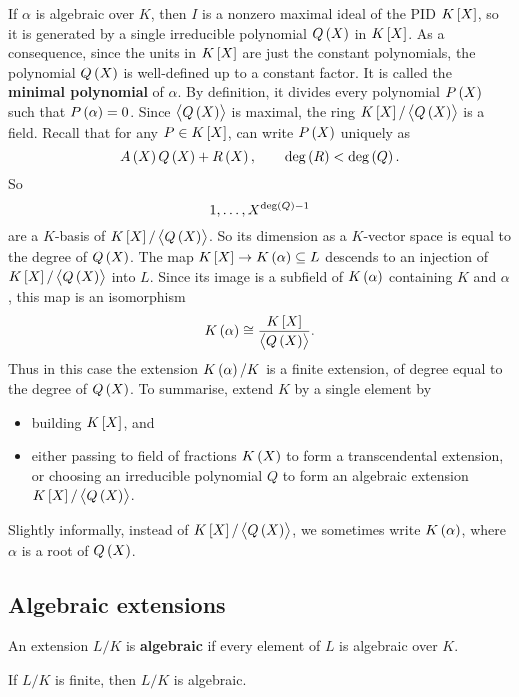 If $ \alpha $ is algebraic over $ K $, then $ I $ is a nonzero maximal ideal of the PID $ K\sbr{X} $, so it is generated by a single irreducible polynomial $ Q\br{X} $ in $ K\sbr{X} $. As a consequence, since the units in $ K\sbr{X} $ are just the constant polynomials, the polynomial $ Q\br{X} $ is well-defined up to a constant factor. It is called the \textbf{minimal polynomial} of $ \alpha $. By definition, it divides every polynomial $ P\br{X} $ such that $ P\br{\alpha} = 0 $. Since $ \abr{Q\br{X}} $ is maximal, the ring $ K\sbr{X} / \abr{Q\br{X}} $ is a field. Recall that for any $ P \in K\sbr{X} $, can write $ P\br{X} $ uniquely as
$$ A\br{X}Q\br{X} + R\br{X}, \qquad \deg\br{R} < \deg\br{Q}. $$
So
$$ 1, \dots, X^{\deg\br{Q} - 1} $$
are a $ K $-basis of $ K\sbr{X} / \abr{Q\br{X}} $. So its dimension as a $ K $-vector space is equal to the degree of $ Q\br{X} $. The map $ K\sbr{X} \to K\br{\alpha} \subseteq L $ descends to an injection of $ K\sbr{X} / \abr{Q\br{X}} $ into $ L $. Since its image is a subfield of $ K\br{\alpha} $ containing $ K $ and $ \alpha $, this map is an isomorphism
$$ K\br{\alpha} \cong \dfrac{K\sbr{X}}{\abr{Q\br{X}}}. $$
Thus in this case the extension $ K\br{\alpha} / K $ is a finite extension, of degree equal to the degree of $ Q\br{X} $. To summarise, extend $ K $ by a single element by
\begin{itemize}
\item building $ K\sbr{X} $, and
\item either passing to field of fractions $ K\br{X} $ to form a transcendental extension, or choosing an irreducible polynomial $ Q $ to form an algebraic extension $ K\sbr{X} / \abr{Q\br{X}} $.
\end{itemize}
Slightly informally, instead of $ K\sbr{X} / \abr{Q\br{X}} $, we sometimes write $ K\br{\alpha} $, where $ \alpha $ is a root of $ Q\br{X} $.

\subsection{Algebraic extensions}

\begin{definition}
An extension $ L / K $ is \textbf{algebraic} if every element of $ L $ is algebraic over $ K $.
\end{definition}

\begin{proposition}
If $ L / K $ is finite, then $ L / K $ is algebraic.
\end{proposition}

